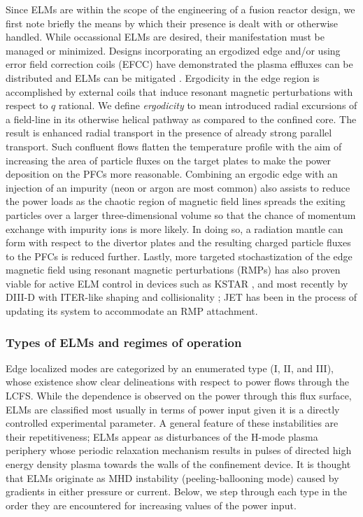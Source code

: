 \documentclass[11pt,titlepage]{report}
\begin{document}
Since ELMs are within the scope of the engineering of a fusion reactor design, we first note briefly the means by which their presence is dealt with or otherwise handled. While occassional ELMs are desired, their manifestation must be managed or minimized. Designs incorporating an ergodized edge and/or using error field correction coils (EFCC) have demonstrated the plasma effluxes can be distributed and ELMs can be mitigated \cite{Nardon}. Ergodicity in the edge region is accomplished by external coils that induce resonant magnetic perturbations with respect to $q$ rational. We define \emph{ergodicity} to mean introduced radial excursions of a field-line in its otherwise helical pathway as compared to the confined core. The result is enhanced radial transport in the presence of already strong parallel transport. Such confluent flows flatten the temperature profile with the aim of increasing the area of particle fluxes on the target plates to make the power deposition on the PFCs more reasonable. Combining an ergodic edge with an injection of an impurity (neon or argon are most common) also assists to reduce the power loads as the chaotic region of magnetic field lines spreads the exiting particles over a larger three-dimensional volume so that the chance of momentum exchange with impurity ions is more likely. In doing so, a radiation mantle can form with respect to the divertor plates and the resulting charged particle fluxes to the PFCs is reduced further.  Lastly, more targeted stochastization of the edge magnetic field using resonant magnetic perturbations (RMPs) has also proven viable for active ELM control in devices such as KSTAR \cite{EFDA_KSTAR_ELM_control}, and most recently by DIII-D with ITER-like shaping and collisionality \cite{DIII-D_ELM_suppression}; JET has been in the process of updating its system to accommodate an RMP attachment. 

\subsubsection{Types of ELMs and regimes of operation}

\indent\indent Edge localized modes are categorized by an enumerated type (I, II, and III), whose existence show clear delineations with respect to power flows through the LCFS. While the dependence is observed on the power through this flux surface, ELMs are classified most usually in terms of power input given it is a directly controlled experimental parameter. A general feature of these instabilities are their repetitiveness; ELMs appear as disturbances of the H-mode plasma periphery whose periodic relaxation mechanism results in pulses of directed high energy density plasma towards the walls of the confinement device. It is thought that ELMs originate as MHD instability (peeling-ballooning mode) caused by gradients in either pressure or current. Below, we step through each type in the order they are encountered for increasing values of the power input. 
\end{document}
